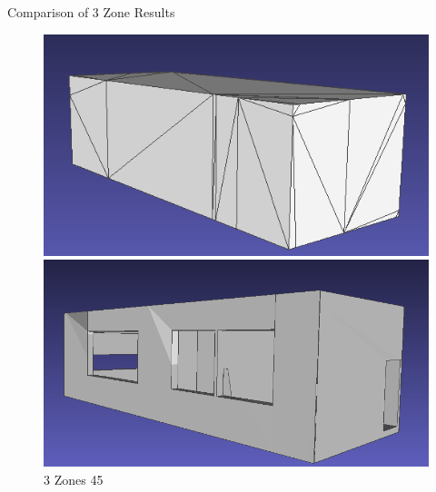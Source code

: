 \documentclass[10pt]{beamer}
\begin{document}
\begin{frame}{Comparison of 3 Zone Results}
\begin{figure}
  \centering
  \begin{minipage}[b]{0.48\textwidth}
    \centering
    \includegraphics[width=\textwidth]{../image/3zone_500_0.06.png}
    \caption{3 Zone 500}
  \end{minipage}\hfill
  \begin{minipage}[b]{0.48\textwidth}
    \centering
    \includegraphics[width=\textwidth]{../image/3zones_45_0.06.png}
    \caption{3 Zones 45}
  \end{minipage}
\end{figure}
\end{frame}
\end{document}
